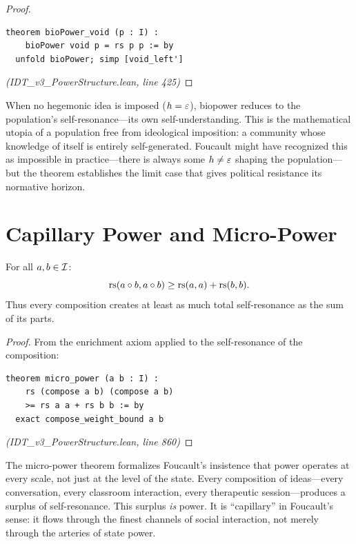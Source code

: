 \begin{proof}
\begin{lstlisting}
theorem bioPower_void (p : I) :
    bioPower void p = rs p p := by
  unfold bioPower; simp [void_left']
\end{lstlisting}
\textit{(IDT\_v3\_PowerStructure.lean, line 425)}
\end{proof}

\begin{interpretation}
When no hegemonic idea is imposed ($h = \varepsilon$), biopower reduces to the
population's self-resonance---its own self-understanding. This is the
mathematical utopia of a population free from ideological imposition:
a community whose knowledge of itself is entirely self-generated. Foucault
might have recognized this as impossible in practice---there is always some
$h \neq \varepsilon$ shaping the population---but the theorem establishes the
limit case that gives political resistance its normative horizon.
\end{interpretation}

\section{Capillary Power and Micro-Power}

\begin{theorem}
\label{thm:micro-power}
For all $a, b \in \mathcal{I}$:
\[
  \mathrm{rs}(a \circ b, a \circ b) \geq \mathrm{rs}(a,a) + \mathrm{rs}(b,b).
\]
Thus every composition creates at least as much total self-resonance as the
sum of its parts.
\end{theorem}

\begin{proof}
From the enrichment axiom applied to the self-resonance of the composition:
\begin{lstlisting}
theorem micro_power (a b : I) :
    rs (compose a b) (compose a b)
    >= rs a a + rs b b := by
  exact compose_weight_bound a b
\end{lstlisting}
\textit{(IDT\_v3\_PowerStructure.lean, line 860)}
\end{proof}

\begin{interpretation}
The micro-power theorem formalizes Foucault's insistence that power operates at
every scale, not just at the level of the state. Every composition of ideas---every
conversation, every classroom interaction, every therapeutic session---produces a
surplus of self-resonance. This surplus \emph{is} power. It is ``capillary'' in
Foucault's sense: it flows through the finest channels of social interaction, not
merely through the arteries of state power.
\end{interpretation}

